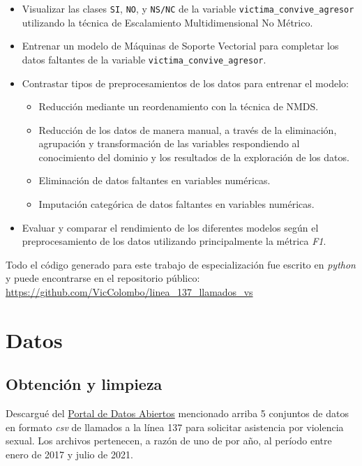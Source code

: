 \documentclass[10 pt]{article}
\begin{document}
\begin{itemize}
\item Visualizar las clases \texttt{SI}, \texttt{NO}, y \texttt{NS/NC} de la variable \texttt{victima\_convive\_agresor} utilizando la técnica de Escalamiento Multidimensional No Métrico.
\item Entrenar un modelo de Máquinas de Soporte Vectorial para completar los datos faltantes de la variable \texttt{victima\_convive\_agresor}.
\item Contrastar tipos de preprocesamientos de los datos para entrenar el modelo: 
\begin{itemize}
    \item Reducción mediante un reordenamiento con la técnica de NMDS.
    \item Reducción de los datos de manera manual, a través de la eliminación, agrupación y transformación de las variables respondiendo al conocimiento del dominio y los resultados de la exploración de los datos. 
    \item Eliminación de datos faltantes en variables numéricas.
    \item Imputación categórica de datos faltantes en variables numéricas. 
\end{itemize}
\item Evaluar y comparar el rendimiento de los diferentes modelos según el preprocesamiento de los datos utilizando principalmente la métrica \textit{F1}.
    
\end{itemize}


Todo el código generado para este trabajo de especialización fue escrito en \textit{python} y puede encontrarse en el repositorio público: \url{https://github.com/VicColombo/linea_137_llamados_vs}


\section{Datos}\label{datos}

\subsection{Obtención y limpieza}\label{limpieza}
Descargué del \href{http://datos.jus.gob.ar/}{Portal de Datos Abiertos} mencionado arriba 5 conjuntos de datos en formato \textit{csv} de llamados a la línea 137 para solicitar asistencia por violencia sexual. Los archivos pertenecen, a razón de uno de por año, al período entre enero de 2017 y julio de 2021. 
\end{document}
